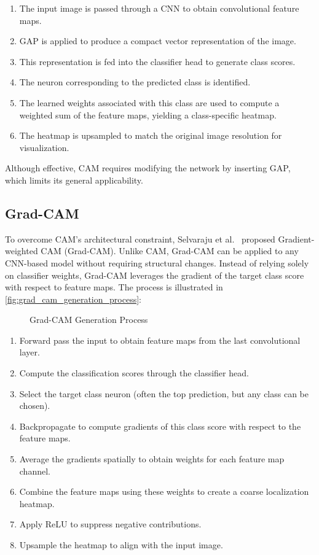 \begin{enumerate}
    \item The input image is passed through a CNN to obtain convolutional feature maps.
    \item GAP is applied to produce a compact vector representation of the image.
    \item This representation is fed into the classifier head to generate class scores.
    \item The neuron corresponding to the predicted class is identified.
    \item The learned weights associated with this class are used to compute a weighted sum of the feature maps, yielding a class-specific heatmap.
    \item The heatmap is upsampled to match the original image resolution for visualization.
\end{enumerate}

Although effective, CAM requires modifying the network by inserting GAP, which limits its general applicability.

\subsection{Grad-CAM}
\label{subsec:grad_cam}

To overcome CAM's architectural constraint, Selvaraju et al.~\cite{cam_grad} proposed Gradient-weighted CAM (Grad-CAM). Unlike CAM, Grad-CAM can be applied to any CNN-based model without requiring structural changes. Instead of relying solely on classifier weights, Grad-CAM leverages the gradient of the target class score with respect to feature maps. The process is illustrated in \autoref{fig:grad_cam_generation_process}:

\begin{figure}[htbp]
    \centering
    \caption{Grad-CAM Generation Process}
    \label{fig:grad_cam_generation_process}
\end{figure}

\begin{enumerate}
    \item Forward pass the input to obtain feature maps from the last convolutional layer.
    \item Compute the classification scores through the classifier head.
    \item Select the target class neuron (often the top prediction, but any class can be chosen).
    \item Backpropagate to compute gradients of this class score with respect to the feature maps.
    \item Average the gradients spatially to obtain weights for each feature map channel.
    \item Combine the feature maps using these weights to create a coarse localization heatmap.
    \item Apply ReLU to suppress negative contributions.
    \item Upsample the heatmap to align with the input image.
\end{enumerate}

